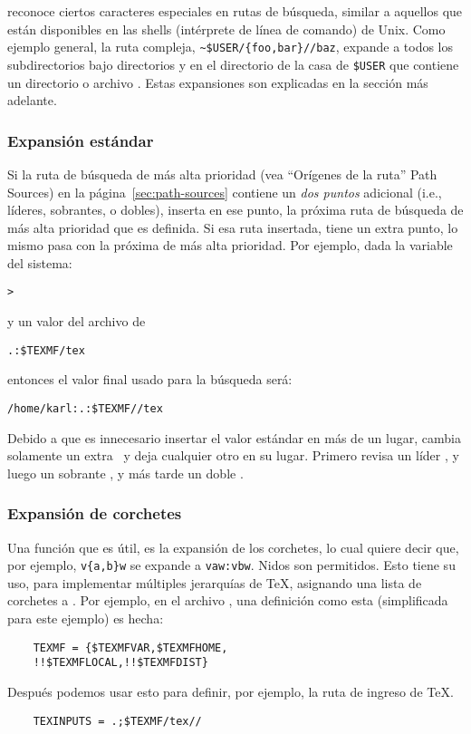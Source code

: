 \documentclass{article}
\begin{document}
	\KPS{} reconoce ciertos caracteres especiales en rutas
	de búsqueda, similar a aquellos que están disponibles
	en las shells (intérprete de línea de comando) de Unix.
	Como ejemplo general, la ruta compleja,
	\verb+~$USER/{foo,bar}//baz+, expande a todos los
	subdirectorios bajo directorios  y 
	en el directorio de la casa de \texttt{\$USER} que
	contiene un directorio o archivo . Estas
	expansiones son explicadas en la sección más adelante.
	
	\subsubsection{Expansión estándar}
	\label{sec:default-expansion}

	Si la ruta de búsqueda de más alta prioridad (vea
	``Orígenes de la ruta'' Path Sources) en la página~\ref{sec:path-sources}
	contiene un \emph{dos puntos} adicional (i.e., líderes,
	sobrantes, o dobles), \KPS{} inserta en ese punto, la
	próxima ruta de búsqueda de más alta prioridad que es
	definida. Si esa ruta insertada, tiene un extra punto,
	lo mismo pasa con la próxima de más alta prioridad.
	Por ejemplo, dada la variable del sistema:

\begin{alltt}
	> 
\end{alltt}
y un valor  del archivo  de

\begin{alltt}
	.:\$TEXMF/tex
\end{alltt}
entonces el valor final usado para la búsqueda será:

\begin{alltt}
	/home/karl:.:\$TEXMF//tex
\end{alltt}

Debido a que es innecesario insertar el valor estándar en más
de un lugar, \KPS{} cambia solamente un extra \samp{:}\ y deja
cualquier otro en su lugar. Primero revisa un líder \samp{:},
y luego un sobrante \samp{:}, y más tarde un doble \samp{:}.

\subsubsection{Expansión de corchetes}
\label{sec:brace-expansion}

Una función que es útil, es la expansión de los
corchetes, lo cual quiere decir que, por ejemplo,
\verb+v{a,b}w+ se expande a \verb+vaw:vbw+. Nidos son
permitidos. Esto tiene su uso, para implementar múltiples
jerarquías de \TeX{}, asignando una lista de corchetes a
.
Por ejemplo, en el archivo , una definición
como esta (simplificada para este ejemplo) es hecha:
\begin{verbatim}
	TEXMF = {$TEXMFVAR,$TEXMFHOME,
	!!$TEXMFLOCAL,!!$TEXMFDIST}
\end{verbatim}
Después podemos usar esto para definir, por ejemplo, la ruta de
ingreso de \TeX{}. 
\begin{verbatim}
	TEXINPUTS = .;$TEXMF/tex//
\end{verbatim}
\end{document}
